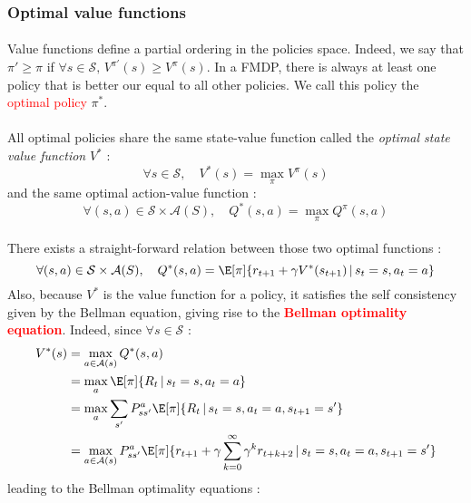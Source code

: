 \documentclass[a4paper]{article}
\begin{document}
{{			\subsubsection{Optimal value functions}
			{
				\paragraph{} Value functions define a partial ordering in the policies space. Indeed, we say that $\pi' \geq \pi$ if $\forall s \in\mathcal{S}, \, V^{\pi'}(s) \geq V^\pi(s)$. In a FMDP, there is always at least one policy that is better our equal to all other policies. We call this policy the \textcolor{red}{optimal policy} $\pi^*$. 
				
				\paragraph{} All optimal policies share the same state-value function called the \emph{optimal state value function} $V^*$ : 
				\begin{equation}
					\forall{s}\in\mathcal{S}, \quad V^*(s) = \max_{\pi} V^\pi(s)
				\end{equation}
				and the same optimal action-value function :
				\begin{equation}
					\forall{(s,a)}\in\mathcal{S}\times\mathcal{A}(S), \quad Q^*(s,a) = \max_{\pi} Q^\pi(s,a)
				\end{equation} 
				
				\paragraph{} There exists a straight-forward relation between those two optimal functions : 
				\begin{equation}
					\forall{(s,a)}\in\mathcal{S}\times\mathcal{A}(S), \quad Q^*(s,a) = \E[\pi]{r_{t+1} + \gamma V^*(s_{t+1}) \, \vert \, s_t=s, a_t =a}
				\end{equation}
				Also, because $V^*$ is the value function for a policy, it satisfies the self consistency given by the Bellman equation, giving rise to the \textbf{\textcolor{red}{Bellman optimality equation}}. Indeed, since $\forall s\in\mathcal{S}$ : 
				\begin{equation}
					\begin{aligned} 
						V^*(s) &= \max_{a\in\mathcal{A}(s)} Q^*(s,a) \\
							  &= \max_{a} \E[\pi]{R_t \, \vert \, s_t =s, a_t = a}\\
							  &= \max_{a} \sum_{s'} P_{ss'}^a \E[\pi]{R_t \, \vert \, s_t =s, a_t = a, s_{t+1}=s'}\\
							  &= \max_{a\in\mathcal{A}(s)} P_{ss'}^a \E[\pi]{r_{t+1} + \gamma\sum_{k=0}^\infty \gamma^k r_{t+k+2} \, \vert \, s_t =s, a_t = a, s_{t+1}=s'}
					\end{aligned}
				\end{equation}
				leading to the Bellman optimality equations :
				\vspace{10pt}
				
}}}
\end{document}
